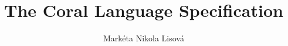 \documentclass[12pt,a4paper,twoside,titlepage]{book}
\begin{document}
\frontmatter
\title{The Coral Language Specification}
\author{Markéta Nikola Lisová}
\maketitle
\clearemptydoublepage
\tableofcontents

\mainmatter
\sloppy



\appendix

\end{document}
